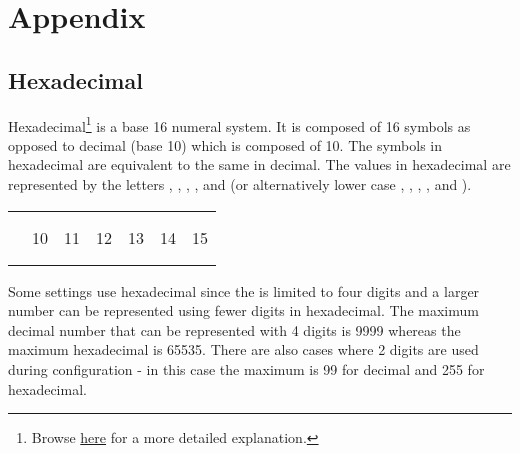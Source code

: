 \part*{Appendix}

\renewcommand{\thechapter}{A}
\chapter{Hexadecimal} \label{Hexadecimal}

Hexadecimal\footnote{Browse \href{https://en.wikipedia.org/wiki/Hexadecimal}{here}
for a more detailed explanation.} is a base \num{16} numeral system.  It is
composed of \num{16} symbols as opposed to decimal (base \num{10}) which is
composed of \num{10}. The symbols  in hexadecimal are equivalent to
the same in decimal.  The values  in hexadecimal are represented by
the letters , , , ,  and  (or
alternatively lower case , , , ,  and
).

\begin{table}[H]
  \begin{tabu}{ X[3,l,m] X[1,c,m] X[1,c,m] X[1,c,m] X[1,c,m] X[1,c,m] X[1,c,m] }
    \thrule
     \\ \mdrule

      & 
      & 
      & 
      & 
      & 
      & 
    \\ \mrule
      & \num{10}
      & \num{11}
      & \num{12}
      & \num{13}
      & \num{14}
      & \num{15}
    \\ \mrule
      & 
      & 
      & 
      & 
      & 
      & 
    \\ \mrule
  \end{tabu}
\end{table}

Some settings use hexadecimal since the  is limited to four digits
and a larger number can be represented using fewer digits in hexadecimal. The
maximum decimal number that can be represented with \num{4} digits is
\num{9999} whereas the maximum hexadecimal is \num{65535}.  There are also
cases where \num{2} digits are used during configuration - in this case the
maximum is \num{99} for decimal and \num{255} for hexadecimal.

